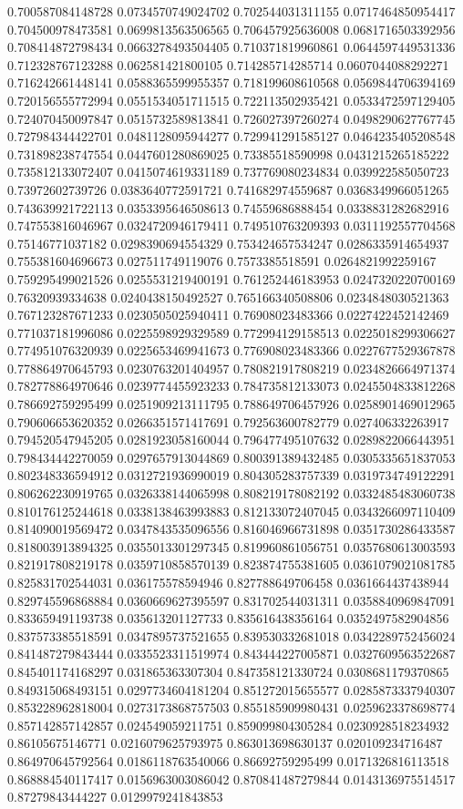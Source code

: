 \begin{table}
\begin{tabu}
\begin{sparkline}{10}
0.700587084148728 0.0734570749024702 0.702544031311155 0.0717464850954417 0.704500978473581 0.0699813563506565 0.706457925636008 0.0681716503392956 0.708414872798434 0.0663278493504405 0.710371819960861 0.0644597449531336 0.712328767123288 0.062581421800105 0.714285714285714 0.0607044088292271 0.716242661448141 0.0588365599955357 0.718199608610568 0.0569844706394169 0.720156555772994 0.0551534051711515 0.722113502935421 0.0533472597129405 0.724070450097847 0.0515732589813841 0.726027397260274 0.0498290627767745 0.727984344422701 0.0481128095944277 0.729941291585127 0.0464235405208548 0.731898238747554 0.0447601280869025 0.73385518590998 0.0431215265185222 0.735812133072407 0.0415074619331189 0.737769080234834 0.039922585050723 0.73972602739726 0.0383640772591721 0.741682974559687 0.0368349966051265 0.743639921722113 0.0353395646508613 0.74559686888454 0.0338831282682916 0.747553816046967 0.0324720946179411 0.749510763209393 0.0311192557704568 0.75146771037182 0.0298390694554329 0.753424657534247 0.0286335914654937 0.755381604696673 0.027511749119076 0.7573385518591 0.0264821992259167 0.759295499021526 0.0255531219400191 0.761252446183953 0.0247320220700169 0.76320939334638 0.0240438150492527 0.765166340508806 0.0234848030521363 0.767123287671233 0.0230505025940411 0.76908023483366 0.0227422452142469 0.771037181996086 0.0225598929329589 0.772994129158513 0.0225018299306627 0.774951076320939 0.0225653469941673 0.776908023483366 0.0227677529367878 0.778864970645793 0.0230763201404957 0.780821917808219 0.0234826664971374 0.782778864970646 0.0239774455923233 0.784735812133073 0.0245504833812268 0.786692759295499 0.0251909213111795 0.788649706457926 0.0258901469012965 0.790606653620352 0.0266351571417691 0.792563600782779 0.027406332263917 0.794520547945205 0.0281923058160044 0.796477495107632 0.0289822066443951 0.798434442270059 0.0297657913044869 0.800391389432485 0.0305335651837053 0.802348336594912 0.0312721936990019 0.804305283757339 0.0319734749122291 0.806262230919765 0.0326338144065998 0.808219178082192 0.0332485483060738 0.810176125244618 0.0338138463993883 0.812133072407045 0.0343266097110409 0.814090019569472 0.0347843535096556 0.816046966731898 0.0351730286433587 0.818003913894325 0.0355013301297345 0.819960861056751 0.0357680613003593 0.821917808219178 0.0359710858570139 0.823874755381605 0.0361079021081785 0.825831702544031 0.036175578594946 0.827788649706458 0.0361664437438944 0.829745596868884 0.0360669627395597 0.831702544031311 0.0358840969847091 0.833659491193738 0.035613201127733 0.835616438356164 0.0352497582904856 0.837573385518591 0.0347895737521655 0.839530332681018 0.0342289752456024 0.841487279843444 0.0335523311519974 0.843444227005871 0.0327609563522687 0.845401174168297 0.031865363307304 0.847358121330724 0.0308681179370865 0.849315068493151 0.0297734604181204 0.851272015655577 0.0285873337940307 0.853228962818004 0.0273173868757503 0.855185909980431 0.0259623378698774 0.857142857142857 0.024549059211751 0.859099804305284 0.0230928518234932 0.86105675146771 0.0216079625793975 0.863013698630137 0.020109234716487 0.864970645792564 0.0186118763540066 0.86692759295499 0.0171326816113518 0.868884540117417 0.0156963003086042 0.870841487279844 0.0143136975514517 0.87279843444227 0.0129979241843853 
\end{sparkline}
\end{tabu}
\end{table}
